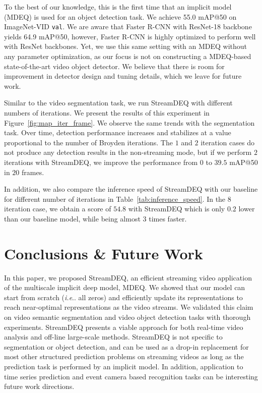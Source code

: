 \documentclass[runningheads]{llncs}
\makeatletter
\DeclareRobustCommand\onedot{\futurelet\@let@token\@onedot}
\def\@onedot{\ifx\@let@token.\else.\null\fi\xspace}
\def\ie{\emph{i.e}\onedot} \def\Ie{\emph{I.e}\onedot}
\makeatother
\begin{document}
To the best of our knowledge, this is the first time that an implicit model (MDEQ) is used for an object detection task. We achieve 55.0 mAP@50 on ImageNet-VID \texttt{val}. We are aware that Faster R-CNN with ResNet-18 backbone yields 64.9 mAP@50, however, Faster R-CNN is highly optimized to perform well with ResNet backbones. Yet, we use this same setting with an MDEQ without any parameter optimization, as our focus is not on constructing a  MDEQ-based state-of-the-art video object detector. We believe that there is room for improvement in detector design and tuning details, which we leave for future work. 


Similar to the video segmentation task, we run StreamDEQ with different numbers of iterations. We present the results of this experiment in Figure~\ref{fig:map_iter_frame}. We observe the same trends with the segmentation task. Over time, detection performance increases and stabilizes at a value proportional to the number of Broyden iterations. The $1$ and $2$ iteration cases do not produce any detection results in the non-streaming mode, but if we perform $2$ iterations with StreamDEQ, we improve the performance from $0$ to $39.5$ mAP@50 in $20$ frames. 


In addition, we also compare the inference speed of StreamDEQ with our baseline for different number of iterations in Table~\ref{tab:inference_speed}. In the $8$ iteration case, we obtain a score of $54.8$ with StreamDEQ which is only $0.2$ lower than our baseline model, while being almost $3$ times faster.


\section{Conclusions \& Future Work}


In this paper, we proposed StreamDEQ, an efficient streaming video application of the multiscale implicit deep model, MDEQ. We showed that our model can start from scratch (\ie all zeros) and efficiently update its representations to reach near-optimal representations as the video streams. We validated this claim on video semantic segmentation and video object detection tasks with thorough experiments. StreamDEQ presents a viable approach for both  real-time video analysis and off-line large-scale methods. StreamDEQ is not specific to segmentation or object detection, and can be used as a drop-in replacement for most other structured prediction problems on streaming videos as long as the prediction task is performed by an implicit model. In addition, application to time series prediction and event camera based recognition tasks can be interesting future work directions.
\end{document}

